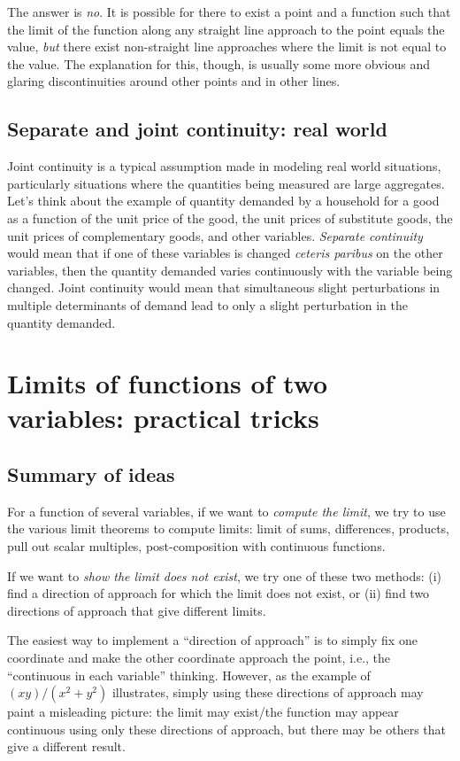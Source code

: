 \documentclass[10pt]{amsart}
\begin{document}
The answer is {\em no}. It is possible for there to exist a point and
a function such that the limit of the function along any straight
line approach to the point equals the value, {\em but} there exist
non-straight line approaches where the limit is not equal to the
value. The explanation for this, though, is usually some more
obvious and glaring discontinuities around other points and in other
lines.


\subsection{Separate and joint continuity: real world}

Joint continuity is a typical assumption made in modeling real world
situations, particularly situations where the quantities being
measured are large aggregates. Let's think about the example of
quantity demanded by a household for a good as a function of the unit
price of the good, the unit prices of substitute goods, the unit
prices of complementary goods, and other variables. {\em Separate
continuity} would mean that if one of these variables is changed {\em
ceteris paribus} on the other variables, then the quantity demanded
varies continuously with the variable being changed. Joint continuity
would mean that simultaneous slight perturbations in multiple
determinants of demand lead to only a slight perturbation in the
quantity demanded.

\section{Limits of functions of two variables: practical tricks}

\subsection{Summary of ideas}

For a function of several variables, if we want to {\em compute the
limit}, we try to use the various limit theorems to compute limits:
limit of sums, differences, products, pull out scalar multiples,
post-composition with continuous functions.

If we want to {\em show the limit does not exist}, we try one of these
two methods: (i) find a direction of approach for which the limit does
not exist, or (ii) find two directions of approach that give different
limits.

The easiest way to implement a ``direction of approach'' is to simply
fix one coordinate and make the other coordinate approach the point,
i.e., the ``continuous in each variable'' thinking. However, as the
example of $(xy)/(x^2 + y^2)$ illustrates, simply using these
directions of approach may paint a misleading picture: the limit may
exist/the function may appear continuous using only these directions
of approach, but there may be others that give a different result. 
\end{document}
